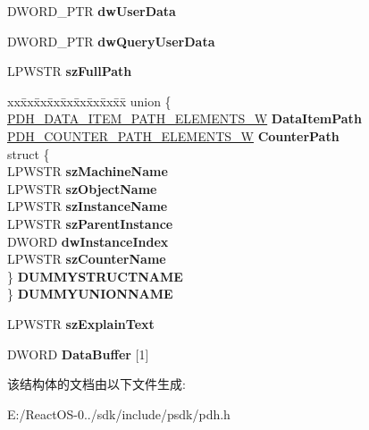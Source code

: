 \begin{DoxyCompactItemize}
D\+W\+O\+R\+D\+\_\+\+P\+TR {\bfseries dw\+User\+Data}
\item 
\mbox{\label{struct___p_d_h___c_o_u_n_t_e_r___i_n_f_o___w_a6fbf10a34b8e9d74d609a8e0e75718d4}} 
D\+W\+O\+R\+D\+\_\+\+P\+TR {\bfseries dw\+Query\+User\+Data}
\item 
\mbox{\label{struct___p_d_h___c_o_u_n_t_e_r___i_n_f_o___w_acab9fe57aafc27c3d8b34599ef125ed7}} 
L\+P\+W\+S\+TR {\bfseries sz\+Full\+Path}
\item 
\mbox{\label{struct___p_d_h___c_o_u_n_t_e_r___i_n_f_o___w_a41bf98d72e8b29c0b0382527a0ed5086}} 
\begin{tabbing}
xx\=xx\=xx\=xx\=xx\=xx\=xx\=xx\=xx\=\kill
union \{\\
\>\hyperlink{struct___p_d_h___d_a_t_a___i_t_e_m___p_a_t_h___e_l_e_m_e_n_t_s___w}{PDH\_DATA\_ITEM\_PATH\_ELEMENTS\_W} {\bfseries DataItemPath}\\
\>\hyperlink{struct___p_d_h___c_o_u_n_t_e_r___p_a_t_h___e_l_e_m_e_n_t_s___w}{PDH\_COUNTER\_PATH\_ELEMENTS\_W} {\bfseries CounterPath}\\
\>struct \{\\
\>\>LPWSTR {\bfseries szMachineName}\\
\>\>LPWSTR {\bfseries szObjectName}\\
\>\>LPWSTR {\bfseries szInstanceName}\\
\>\>LPWSTR {\bfseries szParentInstance}\\
\>\>DWORD {\bfseries dwInstanceIndex}\\
\>\>LPWSTR {\bfseries szCounterName}\\
\>\} {\bfseries DUMMYSTRUCTNAME}\\
\} {\bfseries DUMMYUNIONNAME}\\

\end{tabbing}\item 
\mbox{\label{struct___p_d_h___c_o_u_n_t_e_r___i_n_f_o___w_a32b914610e2c523e8640bc79dc8f5983}} 
L\+P\+W\+S\+TR {\bfseries sz\+Explain\+Text}
\item 
\mbox{\label{struct___p_d_h___c_o_u_n_t_e_r___i_n_f_o___w_a9931ec3a4da6d7419a0b3138b2cf20ca}} 
D\+W\+O\+RD {\bfseries Data\+Buffer} \mbox{[}1\mbox{]}
\end{DoxyCompactItemize}


该结构体的文档由以下文件生成\+:\begin{DoxyCompactItemize}
\item 
E\+:/\+React\+O\+S-\/0../sdk/include/psdk/pdh.\+h\end{DoxyCompactItemize}
